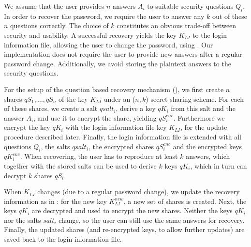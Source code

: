 

We assume that the user provides $n$
answers $A_i$ to suitable security questions $Q_i$. In order to recover the password, we 
require the user to answer any $k$ out of these $n$ questions correctly. 
The choice of $k$ constitutes an obvious trade-off between security and usability.
A successful recovery yields the key $K_{LI}$ to the login information file, allowing
the user to change the password, using .
Our implementation does not require the user to provide new answers
after a regular password change. Additionally, we avoid storing the plaintext answers to the security questions.

For the setup of the question based recovery mechanism (), we first create $n$ 
shares $qS_1, \dots, qS_n$ of the key $K_{LI}$ under an ($n,k$)-secret sharing scheme. For each
of these shares, we create a salt $qsalt_i$, derive a key $qK_i$ from this salt and the
answer $A_i$, and use it to encrypt the share, yielding $qS_i^{enc}$. Furthermore we encrypt the key $qK_i$
with the login information file key $K_{LI}$, for the update procedure described later.
Finally, the login information file is extended with all questions $Q_i$, the salts $qsalt_i$, the encrypted
shares $qS_i^{enc}$ and the encrypted keys $qK_i^{enc}$. When recovering, the
user has to reproduce at least $k$ answers, which together with the stored
salts can be used to derive $k$ keys $qK_i$, which in turn can decrypt $k$
shares $qS_i$.

When $K_{LI}$ changes (\eg due to a regular password change), we update the recovery information
as in : for the new key $K_{LI}^{new}$, a new set of shares is created.
Next, the keys $qK_i$ are decrypted and used to encrypt the new shares. Neither the keys
$qK_i$ nor the salts $salt_i$ change, so the user can still use the same answers for recovery. Finally, the updated
shares (and re-encrypted keys, to allow further updates) are saved back to the login information file.

